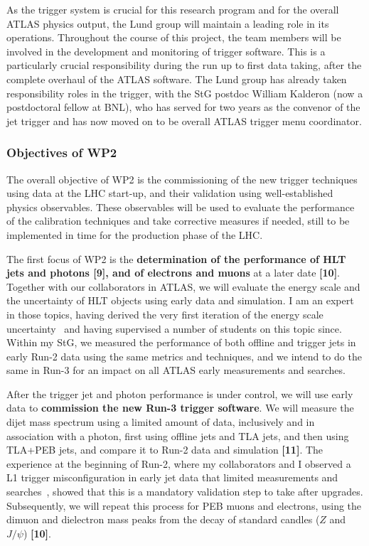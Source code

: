 As the trigger system is crucial for this research program and for the overall ATLAS physics output, the Lund group will maintain a leading role in its operations. 
Throughout the course of this project, the team members will be involved in the development and monitoring of trigger software. 
This is a particularly crucial responsibility during the run up to first data taking, after the complete overhaul of the ATLAS software. 
The Lund group has already taken responsibility roles in the trigger, with the StG postdoc William Kalderon (now a postdoctoral fellow at BNL), who has served for two years as the convenor of the jet trigger and has now moved on to be overall ATLAS trigger menu coordinator. 

\subsubsection{Objectives of WP2}

The overall objective of WP2 is the commissioning of the new trigger techniques using data at the LHC start-up, and their validation using well-established physics observables. These observables will be used to evaluate the performance of the calibration techniques and take corrective measures if needed, still to be implemented in time for the production phase of the LHC. 

The first focus of WP2 is the \textbf{determination of the performance of HLT jets and photons [9], and of electrons and muons} at a later date \textbf{[10]}. 
Together with our collaborators in ATLAS, we will evaluate the energy scale and the uncertainty of HLT objects using early data and simulation. 
I am an expert in those topics, having derived the very first iteration of the energy scale uncertainty~\cite{ToBeCited} %
and having supervised a number of students on this topic since. 
Within my StG, we measured the performance of both offline and trigger jets in early Run-2 data using the same metrics and techniques, 
and we intend to do the same in Run-3 for an impact on all ATLAS early measurements and searches.  

After the trigger jet and photon performance is under control, we will use early data to \textbf{commission the new Run-3 trigger software}. 
We will measure the dijet mass spectrum using a limited amount of data, inclusively and in association with a photon, first using offline jets and TLA jets, and then using TLA+PEB jets, and compare it to Run-2 data and simulation \textbf{[11]}. 
The experience at the beginning of Run-2, where my collaborators and I observed a L1 trigger misconfiguration in early jet data that limited measurements and searches~\cite{Collaboration:2035503}, showed that this is a mandatory validation step to take after upgrades. 
Subsequently, we will repeat this process for PEB muons and electrons, using the dimuon and dielectron mass peaks from the decay of standard candles ($Z$ and $J/\psi$) \textbf{[10]}. 

